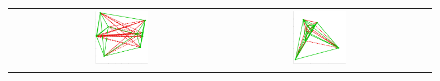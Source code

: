 \documentclass[11pt,a4paper]{book}
\newcommand{\wToy}{0.288}
\newcommand{\raiseToy}{+2.1cm}
\begin{document}
\begin{figure}[h!]
\begin{tabular}{rccc}
    \raisebox{\raiseToy}{(4)} &
    \includegraphics[width=\wToy\textwidth]{img-sgd/toy.3.a} &
    \includegraphics[width=\wToy\textwidth]{img-sgd/toy.3.m} &

\end{tabular}
\end{figure}
\end{document}
